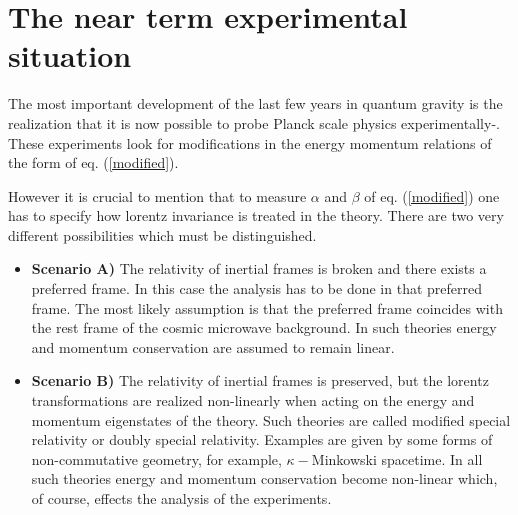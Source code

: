 \documentclass[12pt]{article}
\begin{document}
   
\section{The near term experimental situation}

The most important development of the last few years in quantum gravity
is the realization that it is now possible to probe Planck scale physics
experimentally\cite{GAC1}-\cite{wave}.  These experiments look for modifications in the
energy momentum relations of the form of eq. (\ref{modified}). 

However it is crucial to mention that to measure $\alpha$ and $\beta$ of eq. (\ref{modified}) 
one has to specify how lorentz invariance is treated in the theory. There
are two very different possibilities which must be distinguished.

\begin{itemize}
    
\item{}{\bf Scenario A)} The relativity of inertial frames is broken and 
there exists a 
preferred frame.
In this case the analysis has to be done in that preferred frame. 
The most likely
assumption is that the preferred frame coincides with the
rest frame of the cosmic microwave background.  In such theories energy and
momentum conservation are assumed to remain linear.

\item{}{\bf Scenario B)} The relativity of inertial frames is preserved, 
but the lorentz transformations
are realized non-linearly when acting on the energy and momentum eigenstates of
the theory. Such theories are called modified special relativity or 
doubly special
relativity\cite{gac-dsr,joaolee1,joaolee2,dsr2}. Examples are given by some forms of non-commutative
geometry, for example, $\kappa-$Minkowski spacetime\cite{kappa}.  
In all such theories energy and momentum conservation 
become non-linear which,
of course, effects the analysis of the experiments.

\end{itemize}
 
\end{document}
